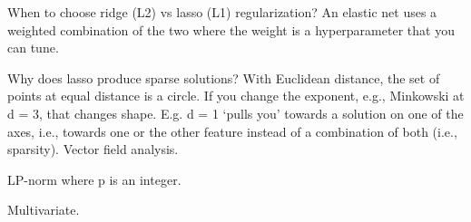 When to choose ridge (L2) vs lasso (L1) regularization?
An elastic net uses a weighted combination of the two where the weight is a
hyperparameter that you can tune.

Why does lasso produce sparse solutions?
With Euclidean distance, the set of points at equal distance is a circle.
If you change the exponent, e.g., Minkowski at d = 3, that changes shape.
E.g. d = 1 `pulls you' towards a solution on one of the axes, i.e., towards one
or the other feature instead of a combination of both (i.e., sparsity).
Vector field analysis.

LP-norm where p is an integer.

Multivariate.

